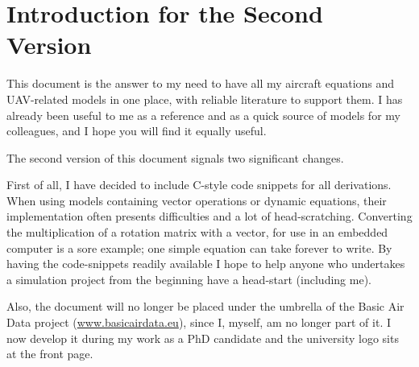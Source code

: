 \chapter{Introduction for the Second Version}

This document is the answer to my need to have all my aircraft equations and UAV-related models in one place, with reliable literature to support them. I has already been useful to me as a reference and as a quick source of models for my colleagues, and I hope you will find it equally useful.

The second version of this document signals two significant changes.

First of all, I have decided to include C-style code snippets for all derivations. When using models containing vector operations or dynamic equations, their implementation often presents difficulties and a lot of head-scratching. Converting the multiplication of a rotation matrix with a vector, for use in an embedded computer is a sore example; one simple equation can take forever to write. By having the code-snippets readily available I hope to help anyone who undertakes a simulation project from the beginning have a head-start (including me).

Also, the document will no longer be placed under the umbrella of the Basic Air Data project (\url{www.basicairdata.eu}), since I, myself, am no longer part of it. I now develop it during my work as a PhD candidate and the university logo sits at the front page.